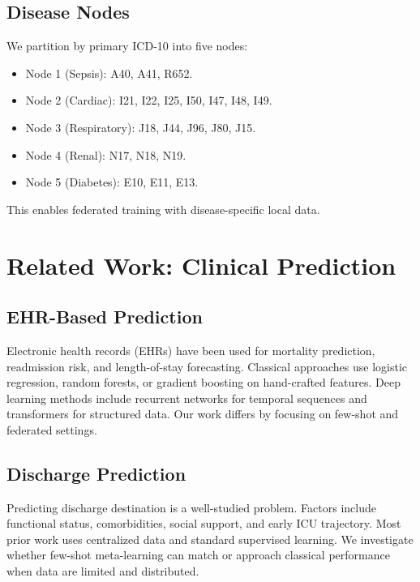 \subsection{Disease Nodes}

We partition by primary ICD-10 into five nodes:
\begin{itemize}
\item Node 1 (Sepsis): A40, A41, R652.
\item Node 2 (Cardiac): I21, I22, I25, I50, I47, I48, I49.
\item Node 3 (Respiratory): J18, J44, J96, J80, J15.
\item Node 4 (Renal): N17, N18, N19.
\item Node 5 (Diabetes): E10, E11, E13.
\end{itemize}
This enables federated training with disease-specific local data.

\section{Related Work: Clinical Prediction}

\subsection{EHR-Based Prediction}

Electronic health records (EHRs) have been used for mortality prediction, readmission risk, and length-of-stay forecasting. Classical approaches use logistic regression, random forests, or gradient boosting on hand-crafted features. Deep learning methods include recurrent networks for temporal sequences and transformers for structured data. Our work differs by focusing on few-shot and federated settings.

\subsection{Discharge Prediction}

Predicting discharge destination is a well-studied problem. Factors include functional status, comorbidities, social support, and early ICU trajectory. Most prior work uses centralized data and standard supervised learning. We investigate whether few-shot meta-learning can match or approach classical performance when data are limited and distributed.

